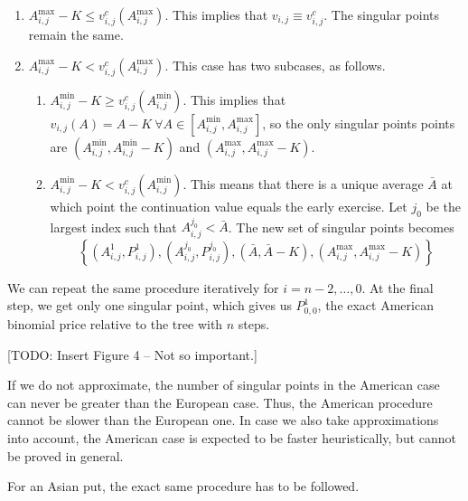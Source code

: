 \begin{enumerate}
	\item $ A_{i,j}^{\max} - K  \le  v_{i,j}^c ( A_{i,j}^{\max} ) $. This implies that $ v_{i,j} \equiv v_{i,j}^c $. The singular points remain the same.
	\item $ A_{i,j}^{\max} - K  <  v_{i,j}^c ( A_{i,j}^{\max} ) $. This case has two subcases, as follows.
	\begin{enumerate}
		\item $ A_{i,j}^{\min} - K  \ge  v_{i,j}^c ( A_{i,j}^{\min} ) $. This implies that $ v_{i,j} (A) = A - K \  \forall A \in [ A_{i,j}^{\min}, A_{i,j}^{\max} ] $, so the only singular points points are $ \left(  A_{i,j}^{\min}, A_{i,j}^{\min} - K  \right) $ and $ \left(  A_{i,j}^{\max}, A_{i,j}^{\max} - K  \right) $.
		\item $ A_{i,j}^{\min} - K  <  v_{i,j}^c ( A_{i,j}^{\min} ) $. This means that there is a unique average $ \bar{A} $ at which point the continuation value equals the early exercise. Let $ j_0 $ be the largest index such that $ A_{i,j}^{j_0} < \bar{A} $. The new set of singular points becomes
		\begin{equation*}
			\left\lbrace  \left( A_{i,j}^{1}, P_{i,j}^{1} \right), \left( A_{i,j}^{j_0}, P_{i,j}^{j_0} \right), \left( \bar{A}, \bar{A} - K \right), \left( A_{i,j}^{\max}, A_{i,j}^{\max} - K \right)  \right\rbrace
		\end{equation*}
	\end{enumerate}
\end{enumerate}

We can repeat the same procedure iteratively for $ i = n-2, \dots, 0 $. At the final step, we get only one singular point, which gives us $ P_{0,0}^1 $, the exact American binomial price relative to the tree with $ n $ steps.

[TODO: Insert Figure 4 -- Not so important.]


\begin{rem}
	If we do not approximate, the number of singular points in the American case can never be greater than the European case. Thus, the American procedure cannot be slower than the European one. In case we also take approximations into account, the American case is expected to be faster heuristically, but cannot be proved in general.
\end{rem}

\begin{rem}[Put]
	For an Asian put, the exact same procedure has to be followed.
\end{rem}

